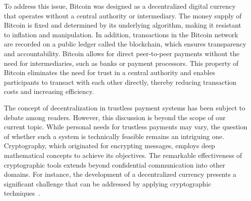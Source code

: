 To address this issue, Bitcoin was designed as a decentralized digital currency that operates without a central authority or intermediary. The
money supply of Bitcoin is fixed and determined by its underlying algorithm, making it resistant to inflation and manipulation. In addition,
transactions in the Bitcoin network are recorded on a public ledger called the blockchain, which ensures transparency and accountability.
Bitcoin allows for direct peer-to-peer payments without the need for intermediaries, such as banks or payment processors. This property of
Bitcoin eliminates the need for trust in a central authority and enables participants to transact with each other directly, thereby reducing
transaction costs and increasing efficiency.

The concept of decentralization in trustless payment systems has been subject to debate among readers. However, this discussion is beyond the
scope of our current topic. While personal needs for trustless payments may vary, the question of whether such a system is technically feasible
remains an intriguing one. Cryptography, which originated for encrypting messages, employs deep mathematical concepts to achieve its objectives.
The remarkable effectiveness of cryptographic tools extends beyond confidential communication into other domains. For instance, the development
of a decentralized currency presents a significant challenge that can be addressed by applying cryptographic techniques~\cite{diffie2022new}.
